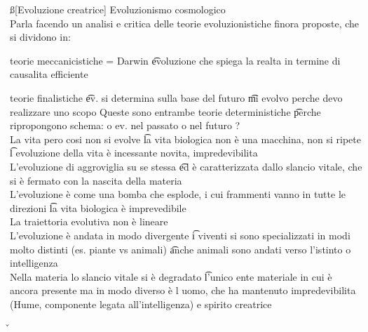 \documentclass[12pt]{article}
\begin{document}
\ss[Evoluzione creatrice]
Evoluzionismo cosmologico \\
Parla facendo un analisi e critica delle teorie evoluzionistiche finora proposte, che si dividono in:
\bi
  \item teorie meccanicistiche = Darwin \t evoluzione che spiega la realta in termine di causalita efficiente
  \item teorie finalistiche \t ev. si determina sulla base del futuro \t mi evolvo perche devo realizzare uno scopo
\ei
Queste sono entrambe teorie deterministiche \t perche ripropongono schema: o ev. nel passato o nel futuro ? \\
La vita pero cosi non si evolve \t la vita biologica non è una macchina, non si ripete \t l evoluzione della vita è incessante novita, impredevibilita \\
L'evoluzione di aggroviglia su se stessa \t ed è caratterizzata dallo slancio vitale, che si è fermato con la nascita della materia \\
L'evoluzione è come una bomba che esplode, i cui frammenti vanno in tutte le direzioni \t la vita biologica è imprevedibile \\
La traiettoria evolutiva non è lineare \\
L'evoluzione è andata in modo divergente \t i viventi si sono specializzati in modi molto distinti (es. piante vs animali) \t anche animali sono andati verso l'istinto o intelligenza \\
Nella materia lo slancio vitale si è degradato \t l'unico ente materiale in cui è ancora presente ma in modo diverso è l uomo, che ha mantenuto impredevibilita (Hume, componente legata all'intelligenza) e spirito creatrice

\v
\end{document}
